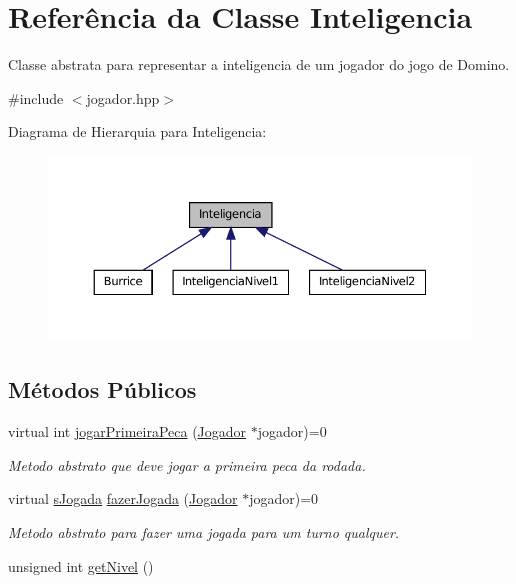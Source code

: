 \hypertarget{classInteligencia}{
\section{Referência da Classe Inteligencia}
\label{classInteligencia}
}


Classe abstrata para representar a inteligencia de um jogador do jogo de Domino.  




{\ttfamily \#include $<$jogador.hpp$>$}



Diagrama de Hierarquia para Inteligencia:\nopagebreak
\begin{figure}[H]
\begin{center}
\leavevmode
\includegraphics[width=366pt]{classInteligencia__inherit__graph}
\end{center}
\end{figure}
\subsection*{Métodos Públicos}
\begin{DoxyCompactItemize}
\item 
virtual int \hyperlink{classInteligencia_ad66cee21015269f35772042f9fa2b97c}{jogarPrimeiraPeca} (\hyperlink{classJogador}{Jogador} $\ast$jogador)=0
\begin{DoxyCompactList}\small\item\em Metodo abstrato que deve jogar a primeira peca da rodada. \item\end{DoxyCompactList}\item 
virtual \hyperlink{structsJogada}{sJogada} \hyperlink{classInteligencia_acb6757c0a14fa9d437d99a777af981ba}{fazerJogada} (\hyperlink{classJogador}{Jogador} $\ast$jogador)=0
\begin{DoxyCompactList}\small\item\em Metodo abstrato para fazer uma jogada para um turno qualquer. \item\end{DoxyCompactList}\item 
unsigned int \hyperlink{classInteligencia_a613d01c7b6e7f862a110ffafd117782c}{getNivel} ()
\end{DoxyCompactItemize}
